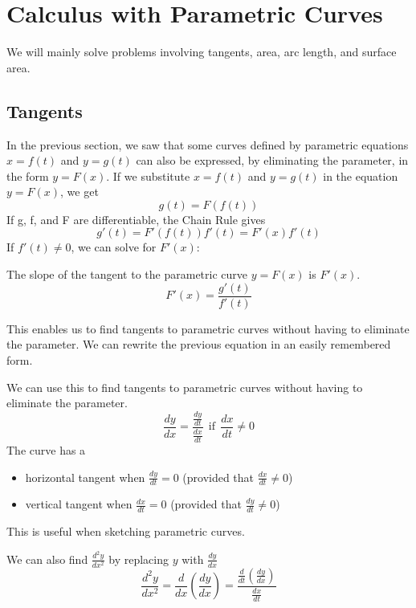 \section{Calculus with Parametric Curves}
  We will mainly solve problems involving tangents, area, arc length, and surface area.

  \subsection*{Tangents}
    In the previous section, we saw that some curves defined by parametric equations $ x = f(t) $ and $ y = g(t) $ can also be expressed, by eliminating the parameter, in the form $ y = F(x) $. If we substitute $ x = f(t) $ and $ y = g(t) $ in the equation $ y = F(x) $, we get
      $$ g(t) = F(f(t)) $$
    If g, f, and F are differentiable, the Chain Rule gives
      $$ g'(t) = F'(f(t))f'(t) = F'(x)f'(t) $$
    If $ f'(t) \neq 0 $, we can solve for $F'(x)$:
    \begin{definition}
      The slope of the tangent to the parametric curve $y=F(x)$ is $F'(x)$.
      $$ F'(x) = \frac{g'(t)}{f'(t)} $$
    \end{definition}
    This enables us to find tangents to parametric curves without having to eliminate the parameter. We can rewrite the
    previous equation in an easily remembered form.
    \begin{definition}
      We can use this to find tangents to parametric curves without having to eliminate the parameter.
      $$ \frac{dy}{dx} = \frac{\frac{dy}{dt}}{\frac{dx}{dt}} \ \ \text{if} \ \ \frac{dx}{dt} \neq 0$$
      The curve has a
      \begin{itemize}
        \item horizontal tangent when $ \frac{dy}{dt} = 0 $ (provided that $\frac{dx}{dt} \neq 0$)
        \item vertical tangent when $ \frac{dx}{dt} = 0 $ (provided that $\frac{dy}{dt} \neq 0$)
      \end{itemize}
      This is useful when sketching parametric curves.
    \end{definition}
    \begin{definition}
      We can also find $ \frac{d^2 y}{dx^2}$ by replacing $y$ with $\frac{dy}{dx}$
      $$ \frac{d^2 y}{dx^2} = \frac{d}{dx}\left(\frac{dy}{dx}\right) = \frac{\frac{d}{dt}\left(\frac{dy}{dx}\right)}{\frac{dx}{dt}}$$
    \end{definition}
